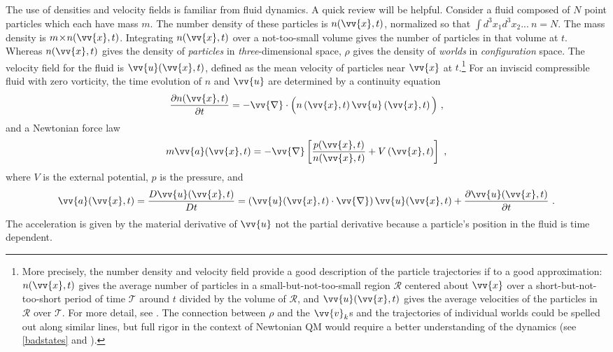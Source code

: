 \documentclass[12pt,secnumarabic,balancelastpage,amsmath,amssymb,nofootinbib]{article}
\begin{document}
The use of densities and velocity fields is familiar from fluid dynamics.  A quick review will be helpful.  Consider a fluid composed of $N$ point particles which each have mass $m$.  The number density of these particles is $n(\vv{x},t)$, normalized so that $\int \! d^3 x_1 d^3 x_2...\: n =N$.  The mass density is $m\!\times\! n(\vv{x},t)$.  Integrating $n(\vv{x},t)$ over a not-too-small volume gives the number of particles in that volume at $t$.  Whereas $n(\vv{x},t)$ gives the density of \emph{particles} in \emph{three}-dimensional space, $\rho$ gives the density of \emph{worlds} in \emph{configuration} space.  The velocity field for the fluid is $\vv{u}(\vv{x},t)$, defined as the mean velocity of particles near $\vv{x}$ at $t$.\footnote{More precisely, the number density and velocity field provide a good description of the particle trajectories if to a good approximation: $n(\vv{x},t)$ gives the average number of particles in a small-but-not-too-small region $\mathcal{R}$ centered about $\vv{x}$ over a short-but-not-too-short period of time $\mathcal{T}$ around $t$ divided by the volume of $\mathcal{R}$, and $\vv{u}(\vv{x},t)$ gives the average velocities of the particles in $\mathcal{R}$ over $\mathcal{T}$.  For more detail, see \citet[][]{chapman1970}.  The connection between $\rho$ and the $\vv{v}_k$s and the trajectories of individual worlds could be spelled out along similar lines, but full rigor in the context of Newtonian QM would require a better understanding of the dynamics (see \textsection \ref{badstates} and \citealp{HDW}).\label{morecareful}}  For an inviscid compressible fluid with zero vorticity, the time evolution of $n$ and $\vv{u}$ are determined by a continuity equation
\begin{equation}
\frac{\partial n(\vv{x},t)}{\partial t}=-\vv{\nabla} \cdot \Big(n\left(\vv{x},t\right)\vv{u}\left(\vv{x},t\right)\Big)\ ,
\label{fluidhamster}
\end{equation}
and a Newtonian force law
\begin{equation}
m \vv{a}(\vv{x},t)=-\vv{\nabla}\left[\frac{p(\vv{x},t)}{n(\vv{x},t)}+V\left(\vv{x},t\right)\right]\ ,
\label{fluideom}
\end{equation}
where $V$ is the external potential, $p$ is the pressure, and
\begin{equation}
\vv{a}(\vv{x},t)=\frac{D\vv{u}(\vv{x},t)}{Dt}=\left(\vv{u}(\vv{x},t)\cdot\vv{\nabla}\right)\vv{u}(\vv{x},t)+\frac{\partial \vv{u}(\vv{x},t)}{\partial t}\ .
\label{fluidaccel}
\end{equation}
The acceleration is given by the material derivative of $\vv{u}$ not the partial derivative because a particle's position in the fluid is time dependent.
\end{document}
